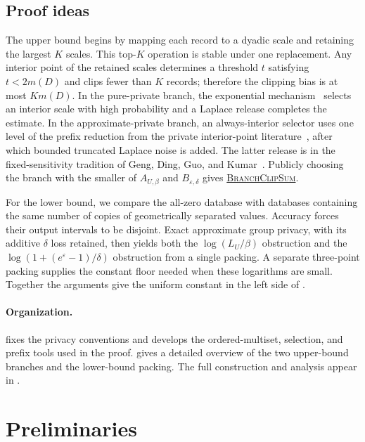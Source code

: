\documentclass[11pt]{article}
\begin{document}
\subsection{Proof ideas}

The upper bound begins by mapping each record to a dyadic scale and retaining
the largest $K$ scales.  This top-$K$ operation is stable under one
replacement.  Any interior point of the retained scales determines a
threshold $t$ satisfying $t<2m(D)$ and clips fewer than $K$ records; therefore
the clipping bias is at most $Km(D)$.  In the pure-private branch, the
exponential mechanism~\cite{McSherryTalwar2007Mechanism} selects an interior
scale with high probability and a Laplace release completes the estimate.  In
the approximate-private branch, an always-interior selector uses one level of
the prefix reduction from the private interior-point
literature~\cite{BunNissimStemmerVadhan2015Thresholds}, after which bounded
truncated Laplace noise is added.  The latter release is in the
fixed-sensitivity tradition of
Geng, Ding, Guo, and Kumar~\cite{GengDingGuoKumar2020Tradeoff}.  Publicly
choosing the branch with the smaller of $A_{U,\beta}$ and
$B_{\varepsilon,\delta}$ gives
\hyperref[alg:branch-clip-sum]{\textsc{BranchClipSum}}.

For the lower bound, we compare the all-zero database with databases
containing the same number of copies of geometrically separated values.
Accuracy forces their output intervals to be disjoint.  Exact approximate
group privacy, with its additive $\delta$ loss retained, then yields both the
$\log(L_U/\beta)$ obstruction and the
$\log(1+(e^\varepsilon-1)/\delta)$ obstruction from a single packing.  A
separate three-point packing supplies the constant floor needed when these
logarithms are small.  Together the arguments give the uniform constant in
the left side of .

\paragraph{Organization.}
 fixes the privacy conventions and develops the
ordered-multiset, selection, and prefix tools used in the proof.
 gives a detailed overview of the two upper-bound branches
and the lower-bound packing.  The full construction and analysis appear in
.

\section{Preliminaries}
\label{sec:preliminaries}
\end{document}
